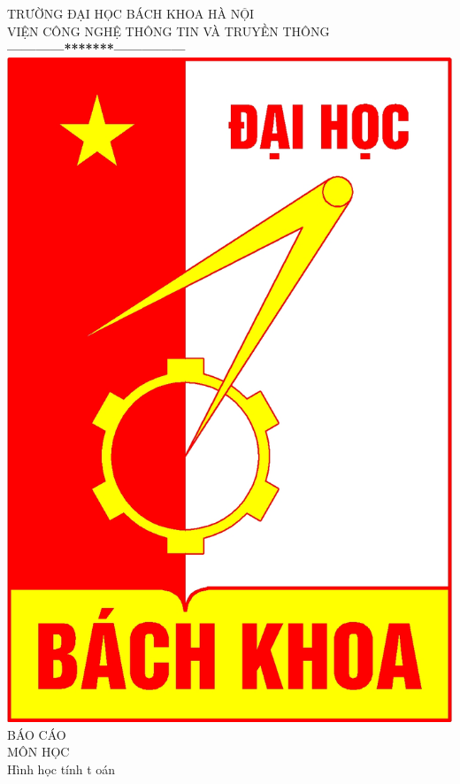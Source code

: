 \documentclass[a4paper,12pt]{report}
\begin{document}
\thispagestyle{empty}
\thisfancypage{
\setlength{\fboxrule}{1pt}
\doublebox}{}

\begin{center}
{\fontsize{16}{19}\selectfont TRƯỜNG ĐẠI HỌC BÁCH KHOA HÀ NỘI\\
VIỆN CÔNG NGHỆ THÔNG TIN VÀ TRUYỀN THÔNG}\\
\textbf{------------*******---------------}\\[1cm]
\includegraphics[scale=0.13]{hust.jpg}\\[1.3cm]
{\fontsize{32}{43}\selectfont BÁO CÁO}\\[0.1cm]
{\fontsize{38}{45}\selectfont MÔN HỌC}\\[0.2cm]
{\fontsize{20}{24}\selectfont Hình học tính t	oán}\\[0.3cm]

\end{center}
\end{document}
